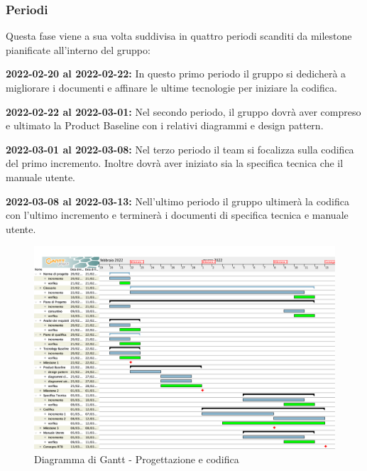 \subsubsection{Periodi}

Questa fase viene a sua volta suddivisa in quattro periodi scanditi da milestone pianificate all'interno del gruppo:

\textbf{2022-02-20 al 2022-02-22:} In questo primo periodo il gruppo si dedicherà a migliorare i documenti e affinare le ultime tecnologie per iniziare la codifica.

\textbf{2022-02-22 al 2022-03-01:} Nel secondo periodo,  il gruppo dovrà aver compreso e ultimato la Product Baseline con i relativi diagrammi e design pattern.

\textbf{2022-03-01 al 2022-03-08:} Nel terzo periodo il team si focalizza sulla codifica del primo incremento.  Inoltre dovrà aver iniziato sia la specifica tecnica che il manuale utente.

\textbf{2022-03-08 al 2022-03-13:} Nell'ultimo periodo il gruppo ultimerà la codifica con l’ultimo incremento e terminerà i documenti di specifica tecnica e manuale utente.

\begin{figure}[H]
\centering
\includegraphics[scale=0.35]{Sezioni/gantt/progettazione_codifica.png}
\caption{Diagramma di Gantt - Progettazione e codifica}
\end{figure}